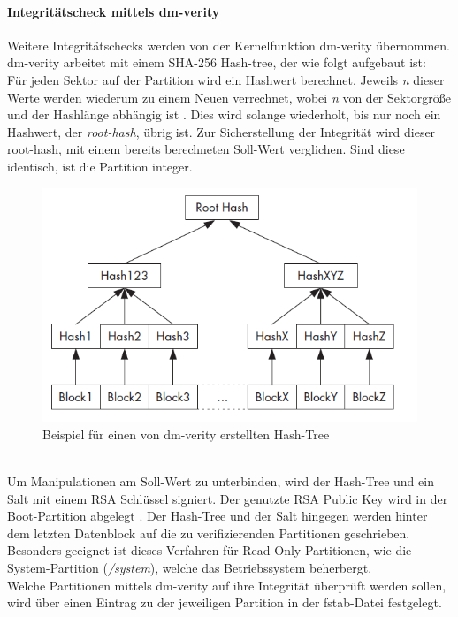 	\paragraph{Integritätscheck mittels dm-verity}
	Weitere Integritätschecks werden von der Kernelfunktion dm-verity übernommen.
	dm-verity arbeitet mit einem SHA-256 Hash-tree, der wie folgt aufgebaut ist:\\
	Für jeden Sektor auf der Partition wird ein Hashwert berechnet. Jeweils
	\textit{n} dieser Werte werden wiederum zu einem Neuen verrechnet, wobei
	\textit{n} von der Sektorgröße und der Hashlänge abhängig ist 
	\cite{dm-verity-doc}. Dies wird solange wiederholt, bis nur noch ein Hashwert,
	der \textit{root-hash}, übrig ist. Zur Sicherstellung der Integrität wird
	dieser root-hash, mit einem bereits berechneten Soll-Wert verglichen.
	Sind diese identisch, ist die Partition integer.
	\begin{figure}[h]
		\centering
		\includegraphics[width=0.7\linewidth]{android_pages/graphics/dm_verity_hash_tree.png}
		\caption{Beispiel für einen von dm-verity erstellten Hash-Tree \cite[S. 255]{Drake2014}}
		\label{fig:dm-verity-table}
	\end{figure}
	\\
	Um Manipulationen am Soll-Wert zu unterbinden, wird der Hash-Tree und ein Salt
	mit einem RSA Schlüssel signiert. Der genutzte RSA Public Key wird in der
	Boot-Partition abgelegt \cite[S. 255]{Drake2014}. Der Hash-Tree und der Salt
	hingegen werden hinter dem letzten Datenblock auf die zu verifizierenden
	Partitionen geschrieben. Besonders geeignet ist dieses Verfahren für Read-Only
	Partitionen, wie die System-Partition (\textit{/system}), welche das
	Betriebssystem beherbergt.\\
	Welche Partitionen mittels dm-verity auf ihre Integrität überprüft werden
	sollen, wird über einen Eintrag zu der jeweiligen Partition in der fstab-Datei
	festgelegt.

